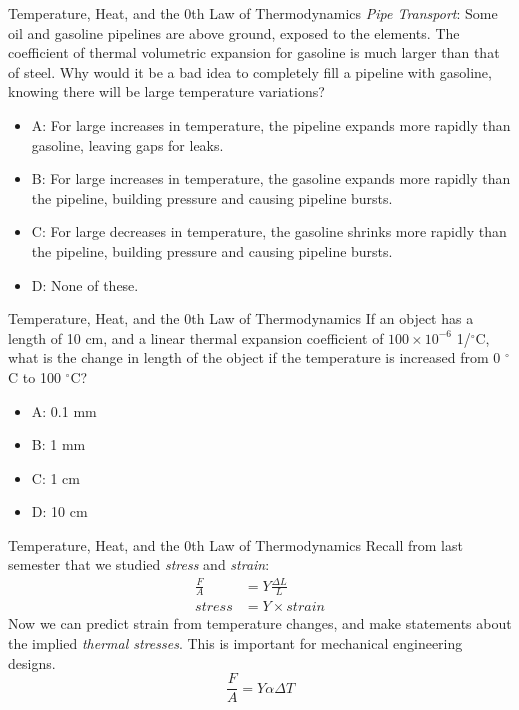\documentclass{beamer}
\begin{document}
\begin{frame}{Temperature, Heat, and the 0th Law of Thermodynamics}
\small
\textit{Pipe Transport}: Some oil and gasoline pipelines are above ground, exposed to the elements.  The coefficient of thermal volumetric expansion for gasoline is much larger than that of steel.  Why would it be a bad idea to completely fill a pipeline with gasoline, knowing there will be large temperature variations?
\begin{itemize}
\item A: For large increases in temperature, the pipeline expands more rapidly than gasoline, leaving gaps for leaks.
\item B: For large increases in temperature, the gasoline expands more rapidly than the pipeline, building pressure and causing pipeline bursts.
\item C: For large decreases in temperature, the gasoline shrinks more rapidly than the pipeline, building pressure and causing pipeline bursts.
\item D: None of these.
\end{itemize}
\end{frame}

\begin{frame}{Temperature, Heat, and the 0th Law of Thermodynamics}
If an object has a length of 10 cm, and a linear thermal expansion coefficient of $100 \times 10^{-6}$ 1/$^{\circ}$C, what is the change in length of the object if the temperature is increased from 0 $^{\circ}$C to 100 $^{\circ}$C?
\begin{itemize}
\item A: 0.1 mm
\item B: 1 mm
\item C: 1 cm
\item D: 10 cm
\end{itemize}
\end{frame}

\begin{frame}{Temperature, Heat, and the 0th Law of Thermodynamics}
Recall from last semester that we studied \textit{stress} and \textit{strain}:
\begin{align}
\frac{F}{A} &= Y \frac{\Delta L}{L} \\
stress &= Y \times strain
\end{align}
Now we can predict strain from temperature changes, and make statements about the implied \textit{thermal stresses}.  This is important for mechanical engineering designs.
\begin{equation}
\frac{F}{A} = Y \alpha \Delta T
\end{equation}
\end{frame}
\end{document}
